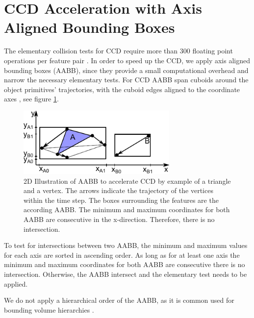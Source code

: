 \section{CCD Acceleration with Axis Aligned Bounding Boxes}
The elementary collision tests for CCD require more than 300 floating point operations per feature pair \cite{HUTTER2007}. 
In order to speed up the CCD, we apply axis aligned bounding boxes (AABB), since they provide a small computational overhead and narrow the necessary elementary tests. For CCD AABB span cuboids around the object primitives' trajectories, with the cuboid edges aligned to the coordinate axes \cite{PROVOT1997}, see figure \ref{fig:ccd_aabb}.
\begin{figure}[h] 
  \centering
     \includegraphics[width=0.7\textwidth]{pics/pdf/ccd_aabb.pdf}
  \caption[2D Illustration of  AABB to accelerate CCD by example of a triangle and a vertex.]{2D Illustration of  AABB to accelerate CCD by example of a triangle and a vertex. The arrows indicate the trajectory of the vertices within the time step. The boxes surrounding the features are the according AABB. The minimum and maximum coordinates for both AABB are consecutive in the x-direction. Therefore, there is no intersection.}
  \label{fig:ccd_aabb}
\end{figure}
To test for intersections between two AABB, the minimum and maximum values for each axis are sorted in ascending order. As long as for at least one axis the minimum and maximum coordinates for both AABB are consecutive there is no intersection. Otherwise, the AABB intersect and the elementary test needs to be applied.

We do not apply a hierarchical order of the AABB, as it is common used for bounding volume hierarchies \cite{TESCHNER2005}.

